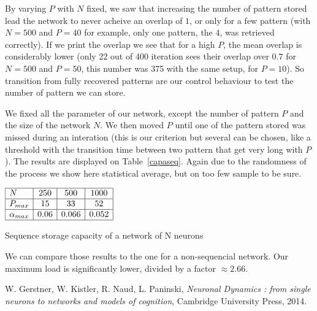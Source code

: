 By varying $P$ with $N$ fixed, we saw that increasing the number of pattern stored lead the network
to never acheive an overlap of $1$, or only for a few pattern (with $N = 500$ and $P = 40$ for example, only one pattern, the $4$,
was retrieved correctly). If we print the overlap we see that for a high $P$, the mean overlap is considerably lower (only 22 out of 400
iteration sees their overlap over $0.7$ for $N = 500$ and $P = 50$, this number was 375 with the same setup, for $P = 10$). So transition
from fully recovered patterns are our control behaviour to test the number of pattern we can store. 

We fixed all the parameter of our network, except the number of pattern $P$ and the size of the
network $N$. We then moved $P$ until one of the pattern stored was missed during an interation (this is our criterion
but several can be chosen, like a threshold with the transition time between two pattern that get very long
with $P$). The results are displayed on Table~\ref{capaseq}. Again due to the randomness of the process
we show here statistical average, but on too few sample to be sure. 

\begin{table}[h]\label{capaseq}
\begin{center}
\begin{math}
    \begin{array}{|l|c|c|c|}
    \hline
    N & 250 & 500 & 1000 \\ \hline
    P_{max} & 15 & 33 & 52 \\ \hline
    \alpha_{max}& 0.06 & 0.066 & 0.052\\ \hline
    \end{array}
\end{math}
\end{center}
\caption{Sequence storage capacity  of a network of N neurons}
\end{table}
 We can compare those results to the one for a non-sequencial network. Our maximum load
 is significantly lower, divided by a factor $\approx 2.66$. 


\begin{thebibliography}{}
 W. Gerstner, W. Kistler, R. Naud, L. Paninski, \textit{Neuronal Dynamics : from single neurons to networks and models of cognition}, Cambridge University Press, 2014.
\end{thebibliography}
